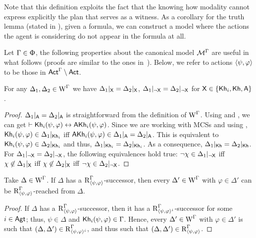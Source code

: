 Note that this definition exploits the fact that the knowing how modality cannot express explicitly the plan that serves as a witness.
As a corollary for the truth lemma (stated in ), given a formula, we can construct a model where the actions the agent is considering do not appear in the formula at all.

Let $\Gamma \in \Upphi$, the following properties about the canonical model $\mathcal{M}^\Gamma$ are useful in what follows (proofs are similar to the ones in~\cite{Wang2016}).  Below, we refer to actions $\langle \psi,\varphi \rangle$ to be those in ${\rm \sf Act}^\Gamma\setminus{\rm \sf Act}$.

\medskip
{}

\begin{proposition}\label{pro:cm-ults-khiml-allsame}
For any $\Delta_1, \Delta_2 \in \operatorname{W}^\Gamma$ we have $\Delta_1|_{{\mathsf{X}}} = \Delta_2|_{{\mathsf{X}}}$, $\Delta_1|_{\lnot{\mathsf{X}}} = \Delta_2|_{\lnot{\mathsf{X}}}$ for ${\mathsf{X}} \in \{ {\sf Kh}_i,{\sf Kh},{\sf A} \}$.
\end{proposition}
\begin{proof}
$\Delta_1\vert_{{\sf A}} = \Delta_2\vert_{{\sf A}}$ is straightforward from the definition of $\operatorname{W}^\Gamma$.
Using  and , we can get $\vdash {\sf Kh}_i(\psi,\varphi) \leftrightarrow {\sf A}{\sf Kh}_i(\psi,\varphi)$.
Since we are working with MCSs and using , ${\sf Kh}_i(\psi,\varphi) \in \Delta_1\vert_{{\sf Kh}_i}$ iff ${\sf A}{\sf Kh}_i(\psi,\varphi) \in \Delta_1\vert_{{\sf A}} = \Delta_2\vert_{{\sf A}}$.
This is equivalent to ${\sf Kh}_i(\psi,\varphi) \in \Delta_2\vert_{{\sf Kh}_i}$ and thus, $\Delta_1\vert_{{\sf Kh}_i} = \Delta_2\vert_{{\sf Kh}_i}$.
As a consequence, $\Delta_1\vert_{{\sf Kh}} = \Delta_2\vert_{{\sf Kh}}$.
For $\Delta_1|_{\lnot{\mathsf{X}}} = \Delta_2|_{\lnot{\mathsf{X}}}$, the following equivalences hold true:
$\neg\chi \in \Delta_1|_{\lnot{\mathsf{X}}}$ iff $\chi \not\in \Delta_1|_{{\mathsf{X}}}$ iff $\chi \not\in \Delta_2|_{{\mathsf{X}}}$ iff $\neg\chi \in \Delta_2|_{\lnot{\mathsf{X}}}$.
\end{proof}

\begin{proposition}\label{pro:cm-ults-khiml-oneall}
Take $\Delta \in \operatorname{W}^\Gamma$. If $\Delta$ has a $\operatorname{R}^\Gamma_{\langle \psi,\varphi \rangle}$-successor, then every $\Delta' \in \operatorname{W}^\Gamma$ with $\varphi \in \Delta'$ can be $\operatorname{R}^\Gamma_{\langle \psi,\varphi \rangle}$-reached from $\Delta$.
\end{proposition}
\begin{proof}
If $\Delta$ has a $\operatorname{R}^\Gamma_{\langle \psi,\varphi \rangle}$-successor, then it has a $\operatorname{R}^\Gamma_{\langle \psi,\varphi \rangle^i}$-successor for some $i \in {\rm \sf Agt}$; thus, $\psi \in \Delta$ and ${\sf Kh}_i(\psi,\varphi) \in \Gamma$.
Hence, every $\Delta' \in \operatorname{W}^\Gamma$ with $\varphi \in \Delta'$ is such that $(\Delta, \Delta') \in \operatorname{R}^\Gamma_{\langle \psi,\varphi \rangle^i}$, and thus such that $(\Delta, \Delta') \in \operatorname{R}^\Gamma_{\langle \psi,\varphi \rangle}$.
\end{proof}

